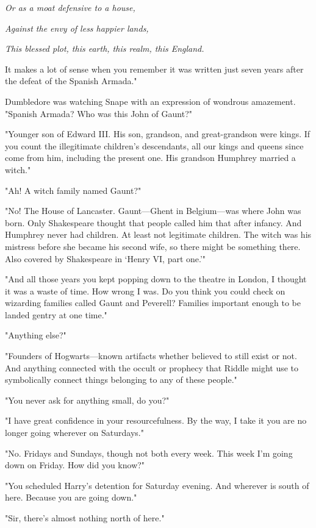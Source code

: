 \emph{Or as a moat defensive to a house,}

\emph{Against the envy of less happier lands,}

\emph{This blessed plot, this earth, this realm, this England.}

\textooquote It makes a lot of sense when you remember it was written just seven years after the defeat of the Spanish Armada."

Dumbledore was watching Snape with an expression of wondrous amazement. "Spanish Armada? Who was this John of Gaunt?"

"Younger son of Edward III. His son, grandson, and great-grandson were kings. If you count the illegitimate children's descendants, all our kings and queens since come from him, including the present one. His grandson Humphrey married a witch."

"Ah! A witch family named Gaunt?"

"No! The House of Lancaster. Gaunt—Ghent in Belgium—was where John was born. Only Shakespeare thought that people called him that after infancy. And Humphrey never had children. At least not legitimate children. The witch was his mistress before she became his second wife, so there might be something there. Also covered by Shakespeare in{\el} `Henry VI, part one.'"

"And all those years you kept popping down to the theatre in London, I thought it was a waste of time. How wrong I was. Do you think you could check on wizarding families called Gaunt and Peverell? Families important enough to be landed gentry at one time."

"Anything else?"

"Founders of Hogwarts—known artifacts whether believed to still exist or not. And anything connected with the occult or prophecy that Riddle might use to symbolically connect things belonging to any of these people."

"You never ask for anything small, do you?"

"I have great confidence in your resourcefulness. By the way, I take it you are no longer going{\el} wherever{\el} on Saturdays."

"No. Fridays and Sundays, though not both every week. This week I'm going down on Friday. How did you know?"

"You scheduled Harry's detention for Saturday evening. And{\el} wherever{\el} is south of here. Because you are going down."

"Sir, there's almost nothing north of here."

